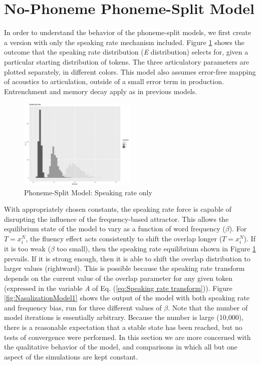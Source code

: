 \section{\label{sec:No-Phoneme-Phoneme-Split-Model}No-Phoneme Phoneme-Split Model}

In order to understand the behavior of the phoneme-split models, we
first create a version with only the speaking rate mechanism included.
Figure \ref{fig:SpeakingRateOnly} shows the outcome that the speaking
rate distribution (\emph{E} distribution) selects for, given a particular
starting distribution of tokens. The three articulatory parameters
are plotted separately, in different colors. This model also assumes
error-free mapping of acoustics to articulation, outside of a small
error term in production. Entrenchment and memory decay apply as in
previous models.

\begin{figure}[h]
\includegraphics[width=0.5\textwidth]{figures/SpeakingRateI10000.pdf}\caption{\label{fig:SpeakingRateOnly}Phoneme-Split Model: Speaking rate only}
\end{figure}

With appropriately chosen constants, the speaking rate force is capable
of disrupting the influence of the frequency-based attractor. This
allows the equilibrium state of the model to vary as a function of
word frequency ($\beta$). For $T=x_{i}^{N}$, the fluency effect
acts consistently to shift the overlap longer ($T=x_{i}^{N}$). If
it is too weak ($\beta$ too small), then the speaking rate equilibrium
shown in Figure \ref{fig:SpeakingRateOnly} prevails. If it is strong
enough, then it is able to shift the overlap distribution to larger
values (rightward). This is possible because the speaking rate transform
depends on the current value of the overlap parameter for any given
token (expressed in the variable \emph{A} of Eq. (\ref{eq:Speaking rate transform})).
Figure \ref{fig:NasalizationModel1} shows the output of the model
with both speaking rate and frequency bias, run for three different
values of $\beta$. Note that the number of model iterations is essentially
arbitrary. Because the number is large (10,000), there is a reasonable
expectation that a stable state has been reached, but no tests of
convergence were performed. In this section we are more concerned
with the qualitative behavior of the model, and comparisons in which
all but one aspect of the simulations are kept constant.

